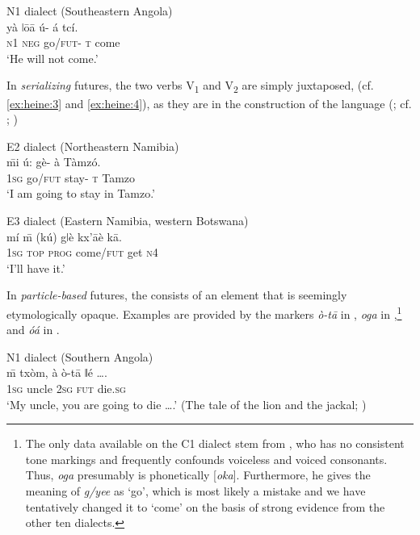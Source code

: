 \documentclass[output=paper]{langsci/langscibook}
\begin{document}
\ea%
    \label{ex:heine:2}
N1 dialect (Southeastern Angola)\\
\gll  yà               ǀōā     ú-       á    tcí.\\
	\textsc{n1}              \textsc{neg}    go/\textsc{fut}-  \textsc{t}   come     \\
\glt ‘He will not come.’
\z


In \textit{serializing} futures, the two verbs V\textsubscript{1} and V\textsubscript{2} are simply juxtaposed, (cf. \ref{ex:heine:3} and \ref{ex:heine:4}), as they are in the  construction of the language (\citealt{König2010}; cf. \citealt{Bisang1998}; \citeyear{Bisang2010})



\ea%
    \label{ex:heine:3} 
E2 dialect (Northeastern Namibia)\\
\gll  \={m}i       ú:        gè-     à    Tàmzó.\\
  \textsc{1sg}     go/\textsc{fut}    stay-    \textsc{t}   Tamzo\\
\glt   ‘I am going to stay in Tamzo.’
\z


\ea%
    \label{ex:heine:4}    
E3 dialect (Eastern Namibia, western Botswana)  \\
\gll   mí \={m}      (kú)      gǀè        kx'{ā}è     k{ā}.\\
  \textsc{1sg}    \textsc{top}    \textsc{prog}    come/\textsc{fut}   get      \textsc{n4}\\
\glt   ‘I'll have it.'
\z



In \textit{particle-based} futures, the  consists of an element that is seemingly etymologically opaque. Examples are provided by the markers \textit{ò-tā} in , \textit{oga} in ,\footnote{The only data available on the C1 dialect stem from \citet{Vedder1910-1911}, who has no consistent tone markings and frequently confounds voiceless and voiced consonants. Thus, \textit{oga} presumably is phonetically [\textit{oka}]. Furthermore, he gives the meaning of \textit{g/yee} as ‘go', which is most likely a mistake and we have tentatively changed it to ‘come' on the basis of strong evidence from the other ten dialects.}  and \textit{óá} in . 



\ea%
    \label{ex:heine:5} 
N1 dialect (Southern Angola)\\
\gll  \={m}       txòm,     à         ò-tā        ǁé {\ob}…{\cb}.\\
   \textsc{1sg}    uncle    \textsc{2sg}     \textsc{fut}    die.\textsc{sg}\\
\glt    ‘My uncle, you are going to die {\ob}…{\cb}.’ 
   (The tale of the lion and the jackal; \citealt{HeineKönigForthc})
\z
\end{document}
